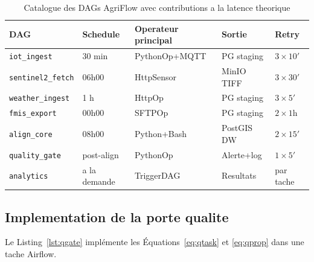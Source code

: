 \documentclass[12pt]{article}
\begin{document}
\begin{table}[H]
	\caption{Catalogue des DAGs AgriFlow avec contributions a la latence theorique}
	\label{tab:dags}
	\centering\small
	\renewcommand{\arraystretch}{1.35}
	\begin{tabularx}{\linewidth}{lllXl}
		\toprule
		\textbf{DAG} & \textbf{Schedule} & \textbf{Operateur principal} &
		\textbf{Sortie} & \textbf{Retry} \\
		\midrule
		\rowcolor{lightblue!40}
		\texttt{iot\_ingest}      & 30 min & PythonOp+MQTT & PG staging & $3\times10'$ \\
		\texttt{sentinel2\_fetch} & 06h00  & HttpSensor    & MinIO TIFF & $3\times30'$ \\
		\rowcolor{lightblue!40}
		\texttt{weather\_ingest}  & 1 h    & HttpOp        & PG staging & $3\times5'$  \\
		\texttt{fmis\_export}     & 00h00  & SFTPOp        & PG staging & $2\times1$h  \\
		\rowcolor{lightblue!40}
		\texttt{align\_core}      & 08h00  & Python+Bash   & PostGIS DW & $2\times15'$ \\
		\texttt{quality\_gate}    & post-align & PythonOp  & Alerte+log & $1\times5'$  \\
		\rowcolor{lightblue!40}
		\texttt{analytics}        & a la demande & TriggerDAG & Resultats & par tache  \\
		\bottomrule
	\end{tabularx}
\end{table}

\subsection{Implementation de la porte qualite}

Le Listing~\ref{lst:qgate} implémente les Équations~\eqref{eq:qtask}
et \eqref{eq:qprop} dans une tache Airflow.
\end{document}
